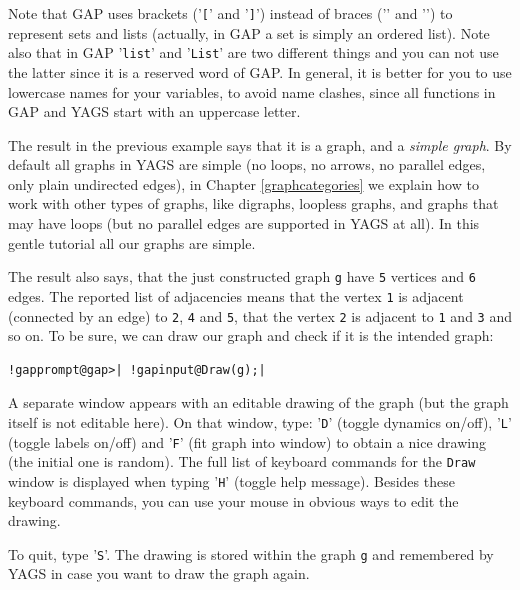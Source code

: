 \documentclass[a4paper,11pt]{report}
\begin{document}
{{Note that \textsf{GAP} uses brackets ('\texttt{[}' and '\texttt{]}') instead of braces ('\texttt{\texttt{}}' and '\texttt{\texttt{}}') to represent sets and lists (actually, in \textsf{GAP} a set is simply an ordered list). Note also that in \textsf{GAP} '\texttt{list}' and '\texttt{List}' are two different things and you can not use the latter since it is a
reserved word of \textsf{GAP}. In general, it is better for you to use lowercase names for your variables,
to avoid name clashes, since all functions in \textsf{GAP} and \textsf{YAGS} start with an uppercase letter. 

The result in the previous example says that it is a graph, and a \emph{simple graph}. By default all graphs in \textsf{YAGS} are simple (no loops, no arrows, no parallel edges, only plain undirected
edges), in Chapter \ref{graphcategories} we explain how to work with other types of graphs, like digraphs, loopless
graphs, and graphs that may have loops (but no parallel edges are supported in \textsf{YAGS} at all). In this gentle tutorial all our graphs are simple. 

The result also says, that the just constructed graph \texttt{g} have \texttt{5} vertices and \texttt{6} edges. The reported list of adjacencies means that the vertex \texttt{1} is adjacent (connected by an edge) to \texttt{2}, \texttt{4} and \texttt{5}, that the vertex \texttt{2} is adjacent to \texttt{1} and \texttt{3} and so on. To be sure, we can draw our graph and check if it is the intended
graph: 


\begin{Verbatim}[commandchars=!@|,fontsize=\small,frame=single,label=Example]
  !gapprompt@gap>| !gapinput@Draw(g);|
\end{Verbatim}
 

A separate window appears with an editable drawing of the graph (but the graph
itself is not editable here). On that window, type: '\texttt{D}' (toggle dynamics on/off), '\texttt{L}' (toggle labels on/off) and '\texttt{F}' (fit graph into window) to obtain a nice drawing (the initial one is
random). The full list of keyboard commands for the \texttt{Draw} window is displayed when typing '\texttt{H}' (toggle help message). Besides these keyboard commands, you can use your
mouse in obvious ways to edit the drawing. 

To quit, type '\texttt{S}'. The drawing is stored within the graph \texttt{g} and remembered by \textsf{YAGS} in case you want to draw the graph again. 

}}
\end{document}

